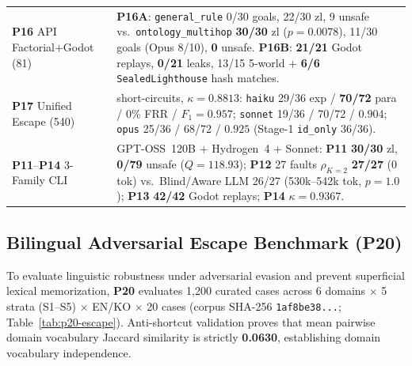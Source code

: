 \begin{table}[!tbp]
\begin{tabularx}{\columnwidth}{@{}>{\raggedright\arraybackslash}p{}>{\raggedright\arraybackslash}X@{}}
\textbf{P16} API Factorial+Godot (81) & \textbf{P16A}: \texttt{general\_rule} 0/30 goals, 22/30 zl, 9 unsafe vs.\ \texttt{ontology\_multihop} \textbf{30/30} zl ($p{=}0.0078$), 11/30 goals (Opus 8/10), \textbf{0} unsafe. \textbf{P16B}: \textbf{21/21} Godot replays, \textbf{0/21} leaks, 13/15 5-world + \textbf{6/6} \texttt{SealedLighthouse} hash matches. \\
\textbf{P17} Unified Escape (540) & 0 short-circuits, $\kappa{=}\mathbf{0.8813}$: \texttt{haiku} 29/36 exp / \textbf{70/72} para / 0\% FRR / $F_1{=}\mathbf{0.957}$; \texttt{sonnet} 19/36 / 70/72 / $0.904$; \texttt{opus} 25/36 / 68/72 / $0.925$ (Stage-1 \texttt{id\_only} 36/36). \\
\textbf{P11}--\textbf{P14} 3-Family CLI & GPT-OSS~120B + Hydrogen~4 + Sonnet: \textbf{P11} \textbf{30/30} zl, \textbf{0/79} unsafe ($Q{=}118.93$); \textbf{P12} 27 faults $\rho_{K=2}$ \textbf{27/27} (0 tok) vs.\ Blind/Aware LLM 26/27 (530k--542k tok, $p{=}1.0$); \textbf{P13} \textbf{42/42} Godot replays; \textbf{P14} $\kappa{=}\mathbf{0.9367}$. \\
\bottomrule
\end{tabularx}
\end{table}

\subsection{Bilingual Adversarial Escape Benchmark (\textbf{P20})}\label{sec:phase6-p20}
To evaluate linguistic robustness under adversarial evasion and prevent superficial lexical memorization, \textbf{P20} evaluates 1,200 curated cases across 6 domains $\times$ 5 strata (S1--S5) $\times$ EN/KO $\times$ 20 cases (corpus SHA-256 \texttt{1af8be38...}; Table~\ref{tab:p20-escape}). Anti-shortcut validation proves that mean pairwise domain vocabulary Jaccard similarity is strictly \textbf{0.0630}, establishing domain vocabulary independence.

